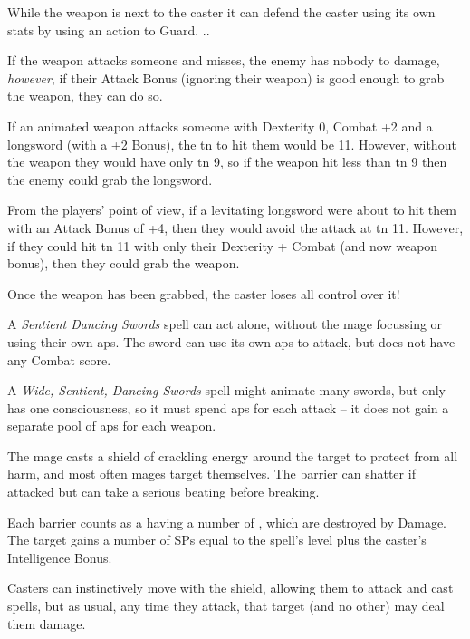\begin{multicols}{2}
{While the weapon is next to the caster it can defend the caster using its own stats by using an action to Guard.
}{.}.

If the weapon attacks someone and misses, the enemy has nobody to damage, \emph{however}, if their Attack Bonus (ignoring their weapon) is good enough to grab the weapon, they can do so.

\begin{exampletext}

  If an animated weapon attacks someone with Dexterity 0, Combat +2 and a longsword (with a +2 Bonus), the \gls{tn} to hit them would be 11.
  However, without the weapon they would have only \gls{tn} 9, so if the weapon hit less than \gls{tn} 9 then the enemy could grab the longsword.

  From the players' point of view, if a levitating longsword were about to hit them with an Attack Bonus of +4, then they would avoid the attack at \gls{tn} 11.
  However, if they could hit \gls{tn} 11 with only their Dexterity + Combat (and now weapon bonus), then they could grab the weapon.

\end{exampletext}

Once the weapon has been grabbed, the caster loses all control over it!

A \textit{Sentient Dancing Swords} spell can act alone, without the mage focussing or using their own \glspl{ap}.
The sword can use its own \glspl{ap} to attack, but does not have any Combat score.

A \textit{Wide, Sentient, Dancing Swords} spell might animate many swords, but only has one consciousness, so it must spend \glspl{ap} for each attack -- it does not gain a separate pool of \glspl{ap} for each weapon.


The mage casts a shield of crackling energy around the target to protect from all harm, and most often mages target themselves.
The barrier can shatter if attacked but can take a serious beating before breaking.

Each barrier counts as a having a number of , which are destroyed by Damage.
The target gains a number of \glspl{SP} equal to the spell's level plus the caster's Intelligence Bonus.

Casters can instinctively move with the shield, allowing them to attack and cast spells, but as usual, any time they attack, that target (and no other) may deal them damage.


\end{multicols}
